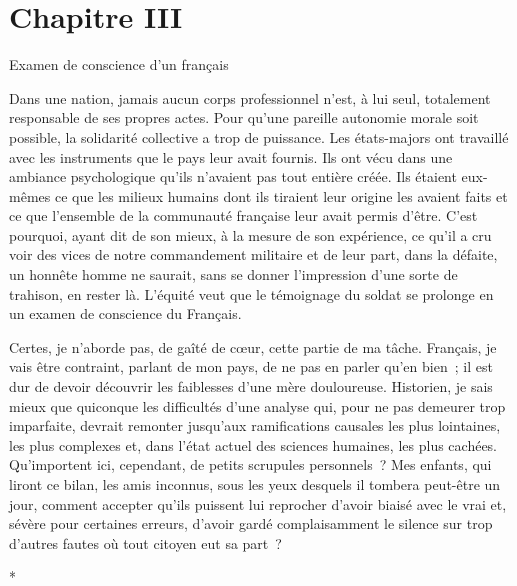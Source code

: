 \documentclass[french,twoside]{book} %
\newcommand\chapteropen{} %
\newcommand\chaptercont{} %
\begin{document}
\chapteropen
\chapter[{Chapitre III}]{Chapitre III}\renewcommand{\leftmark}{Chapitre III}


\chaptercont

\begin{center}
\noindent \centerline{Examen de conscience d’un français}\par
\end{center}

\noindent   Dans une nation, jamais aucun corps professionnel n’est, à lui seul, totalement responsable de ses propres actes. Pour qu’une pareille autonomie morale soit possible, la solidarité collective a trop de puissance. Les états-majors ont travaillé avec les instruments que le pays leur avait fournis. Ils ont vécu dans une ambiance psychologique qu’ils n’avaient pas tout entière créée. Ils étaient eux-mêmes ce que les milieux humains dont ils tiraient leur origine les avaient faits et ce que l’ensemble de la communauté française leur avait permis d’être. C’est pourquoi, ayant dit de son mieux, à la mesure de son expérience, ce qu’il a cru voir des vices de notre commandement militaire et de leur part, dans la défaite, un honnête homme ne saurait, sans se donner l’impression d’une sorte de trahison, en rester là. L’équité veut que le témoignage du soldat se prolonge en un examen de conscience du Français.\par
Certes, je n’aborde pas, de gaîté de cœur, cette partie de ma tâche. Français, je vais être contraint, parlant de mon pays, de ne pas en parler qu’en bien ; il est dur de devoir découvrir les faiblesses d’une mère douloureuse. Historien, je sais mieux que quiconque les difficultés d’une analyse qui, pour ne pas demeurer trop imparfaite, devrait remonter jusqu’aux ramifications causales les plus lointaines, les plus complexes et, dans l’état actuel des sciences humaines, les plus cachées. Qu’importent ici, cependant, de petits scrupules personnels ? Mes enfants,   qui liront ce bilan, les amis inconnus, sous les yeux desquels il tombera peut-être un jour, comment accepter qu’ils puissent lui reprocher d’avoir biaisé avec le vrai et, sévère pour certaines erreurs, d’avoir gardé complaisamment le silence sur trop d’autres fautes où tout citoyen eut sa part ?\par

\begin{center}
\noindent \centerline{*}\par
\end{center}
\end{document}

